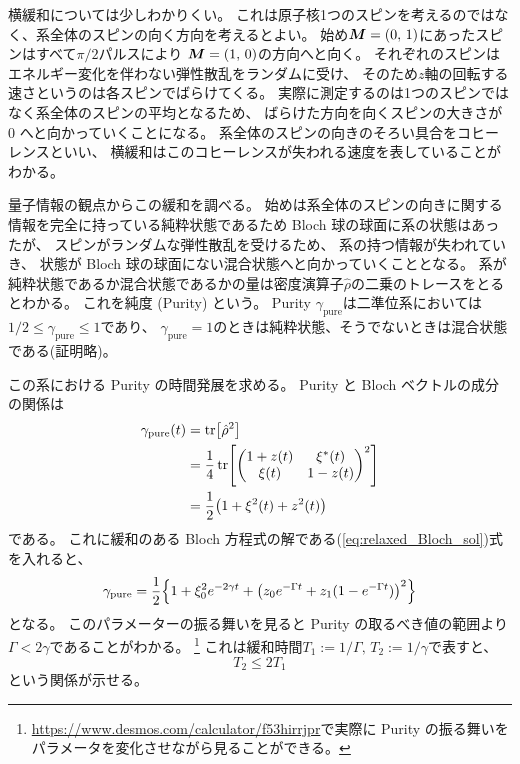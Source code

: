 \documentclass[11pt,dvipdfmx,a4paper]{jsarticle}
\begin{document}
横緩和については少しわかりくい。
これは原子核1つのスピンを考えるのではなく、系全体のスピンの向く方向を考えるとよい。
始め\(\vb*{M}=(0,\,1)\)にあったスピンはすべて\(\pi/2\)パルスにより
\(\vb*{M}=(1,\,0)\)の方向へと向く。
それぞれのスピンはエネルギー変化を伴わない弾性散乱をランダムに受け、
そのため\(z\)軸の回転する速さというのは各スピンでばらけてくる。
実際に測定するのは1つのスピンではなく系全体のスピンの平均となるため、
ばらけた方向を向くスピンの大きさが 0 へと向かっていくことになる。
系全体のスピンの向きのそろい具合をコヒーレンスといい、
横緩和はこのコヒーレンスが失われる速度を表していることがわかる。

量子情報の観点からこの緩和を調べる。
始めは系全体のスピンの向きに関する情報を完全に持っている純粋状態であるため Bloch 球の球面に系の状態はあったが、
スピンがランダムな弾性散乱を受けるため、
系の持つ情報が失われていき、
状態が Bloch 球の球面にない混合状態へと向かっていくこととなる。
系が純粋状態であるか混合状態であるかの量は密度演算子\(\hat{\rho}\)の二乗のトレースをとるとわかる。
これを純度 (Purity) という。
 Purity \(\gamma_{\text{pure}}\)は二準位系においては\(1/2 \leq \gamma_{\text{pure}}\leq 1\)であり、
\(\gamma_{\text{pure}} = 1\)のときは純粋状態、そうでないときは混合状態である(証明略)。

この系における Purity の時間発展を求める。
Purity と Bloch ベクトルの成分の関係は
\begin{align}
	\gamma_{\text{pure}}(t) &= \tr[\hat{\rho}^2] \notag\\
	&=\frac{1}{4}\tr[
		\begin{pmatrix}
			1 + z(t) & \xi^*(t)\\
			\xi(t) & 1 - z(t)
		\end{pmatrix}^2]\notag\\
	&=\frac{1}{2}\qty(1+\xi^2(t)+z^2(t)) \notag\\
\end{align}
である。
これに緩和のある Bloch 方程式の解である(\ref{eq:relaxed_Bloch_sol})式を入れると、
\begin{equation}
	\gamma_{\text{pure}} = \frac{1}{2}\Bigl\{1+\xi_0^2e^{-2\gamma t}+\qty(z_0 e^{-\Gamma t} + z_{1}(1-e^{-\Gamma t}))^2\Bigr\}
\end{equation}
となる。
このパラメーターの振る舞いを見ると Purity の取るべき値の範囲より\(\Gamma < 2\gamma\)であることがわかる。
\footnote{\url{https://www.desmos.com/calculator/f53hirrjpr}で実際に Purity の振る舞いをパラメータを変化させながら見ることができる。}
これは緩和時間\(T_1 := 1/\Gamma,\,T_2 := 1/\gamma\)で表すと、
\begin{equation}
	T_2 \le 2T_1
\end{equation}
という関係が示せる。
\end{document}
